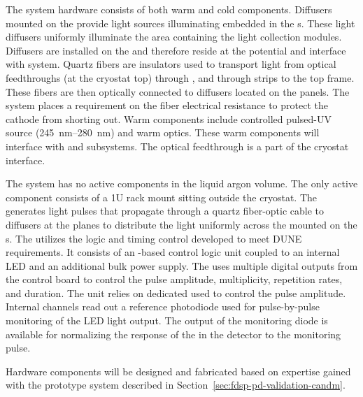 The system hardware consists of both warm and cold components. Diffusers mounted on the  provide light sources illuminating  embedded in the s. These light diffusers uniformly illuminate the  area containing the  light collection modules. %
 Diffusers are installed on the  and therefore reside at the %
  potential and interface with  system. 
Quartz fibers are insulators used to transport light from optical feedthroughs (at the cryostat top) through  , and through  strips to the  top frame. These fibers are then optically connected to diffusers located on the  panels. 
The \hv system places a requirement on the fiber electrical resistance to 
protect the cathode from shorting out. 
Warm components include controlled pulsed-UV source (\SIrange{245}{280}{nm}) and warm optics. These warm components will interface with
 and  subsystems. The optical feedthrough is a part of the cryostat interface.

The system has no active components in the liquid argon volume.
The only active component consists of a 1U rack mount
 sitting outside the cryostat. The  generates light pulses that propagate through a quartz fiber-optic cable to diffusers at the  planes to distribute the light uniformly across the  mounted on the s.
The  utilizes the logic and timing control developed to meet DUNE  requirements. It consists of an -based control logic unit coupled to an internal LED  and an additional bulk power supply. The  uses multiple digital outputs from the control board to control the  pulse
amplitude, multiplicity, repetition rates, and duration. The unit relies on dedicated  used to control the  pulse amplitude. Internal  channels read out a reference photodiode used for pulse-by-pulse monitoring of the LED light output. 
The output of the monitoring diode is available for normalizing the response of the  in the detector to the monitoring pulse.

Hardware components will be designed and fabricated based on expertise gained with the  prototype system described in Section~\ref{sec:fdsp-pd-validation-candm}.




